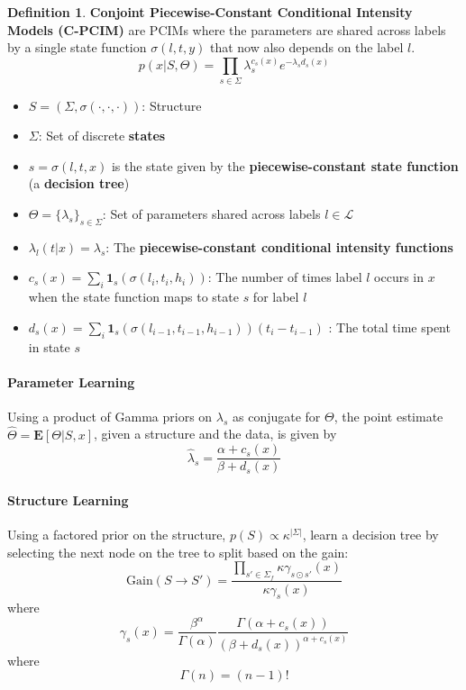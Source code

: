 \documentclass[12pt]{article}
\theoremstyle{plain}
\theoremstyle{definition}
\newtheorem{definition}{Definition}
\theoremstyle{remark}
\begin{document}
\begin{definition}
  \textbf{Conjoint Piecewise-Constant Conditional Intensity Models (C-PCIM)} are
  PCIMs where the parameters are shared across labels by a single state function
  $\sigma(l,t,y)$ that now also depends on the label $l$.
  \begin{equation*}
    p(x|S,\Theta) = \prod_{s\in\Sigma}\lambda_{s}^{c_{s}(x)}
    e^{-\lambda_{s}d_{s}(x)}
  \end{equation*}
  \begin{itemize}
    \item $S=\left(\Sigma,\sigma(\cdot,\cdot,\cdot)\right)$: Structure
    \item $\Sigma$: Set of discrete \textbf{states}
    \item $s=\sigma(l,t,x)$ is the state given by the
      \textbf{piecewise-constant state function} (a \textbf{decision tree})
    \item $\Theta=\{\lambda_s\}_{s\in\Sigma}$: Set of parameters shared across
      labels $l \in \mathcal{L}$
    \item $\lambda_l(t|x)=\lambda_{s}$:
      The \textbf{piecewise-constant conditional intensity functions}
    \item $c_{s}(x)= \sum_i\mathbf{1}_s(\sigma(l_i,t_i,h_i))$:
      The number of times label $l$ occurs in $x$ when the state function maps
      to state $s$ for label $l$
    \item $d_{s}(x) = \sum_{i}\mathbf{1}_s(\sigma(l_{i-1},t_{i-1},h_{i-1}))(t_i-t_{i-1})$
      : The total time spent in state $s$
  \end{itemize}
\end{definition}

\paragraph{Parameter Learning}
Using a product of Gamma priors on $\lambda_s$ as conjugate for $\Theta$,
the point estimate $\hat{\Theta} = \mathbf{E}[\Theta|S,x]$, given a structure
and the data, is given by
\begin{equation*}
  \hat{\lambda}_s = \frac{\alpha + c_s(x)}{\beta + d_s(x)}
\end{equation*}

\paragraph{Structure Learning}
Using a factored prior on the structure, $p(S) \propto \kappa^{|\Sigma|}$,
learn a decision tree \citep{chihecmee97} by selecting the next node on the tree
to split based on the gain:
\begin{equation*}
  \mathrm{Gain}(S \to S') =
  \frac{\prod_{s'\in\Sigma_f}\kappa\gamma_{s \odot s'}(x)}{\kappa\gamma_s(x)}
\end{equation*}
where
\begin{equation*}
  \gamma_s(x) =
  \frac{\beta^{\alpha}}{\Gamma(\alpha)}\frac{\Gamma(\alpha + c_s(x))}{(\beta + d_s(x))^{\alpha + c_s(x)}}
\end{equation*}
where
\begin{equation*}
  \Gamma(n) = (n-1)!
\end{equation*}



\end{document}
